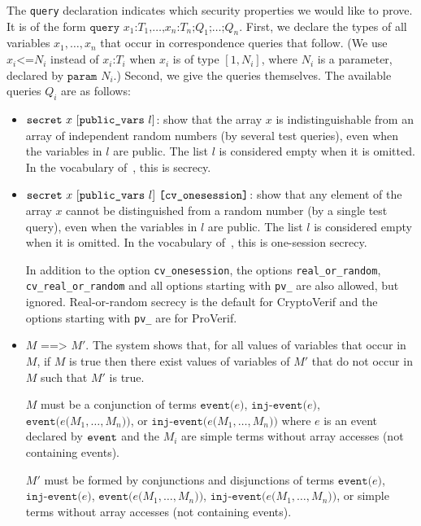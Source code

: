 \begin{itemize}
The {\tt query} declaration indicates which security properties we 
would like to prove. It is of the form $\texttt{query }x_1\texttt{:}T_1\texttt{,} \ldots\texttt{,} x_n\texttt{:}T_n\texttt{;} Q_1\texttt{;} \dots\texttt{;}Q_n$. First, we declare the types of all variables $x_1, \ldots, x_n$
that occur in correspondence queries that follow. (We use $x_i \texttt{<=} N_i$ instead of
  $x_i\texttt{:} T_i$ when $x_i$ is of type $[1,N_i]$, where $N_i$ is
  a parameter, declared by $\texttt{param }N_i$.) Second, we give the queries themselves. The available queries $Q_i$ are as follows:
\begin{itemize}

\item ${\tt secret}\ x\ [\texttt{public\_vars}\ l]$: show that the array $x$ is indistinguishable
from an array of independent random numbers (by several test queries),
even when the variables in $l$ are public. The list $l$ is considered empty when it is omitted.
In the vocabulary of~\cite{BlanchetEPrint05}, this is secrecy.

\item ${\tt secret}\ x\ [\texttt{public\_vars}\ l]\ \texttt{[cv\_onesession]}$: 
show that any element of the array $x$ 
cannot be distinguished from a random number (by a single test query),
even when the variables in $l$ are public. The list $l$ is considered empty when it is omitted.
In the vocabulary of~\cite{BlanchetEPrint05}, this is one-session
secrecy.

In addition to the option \texttt{cv\_onesession}, the options \texttt{real\_or\_random},
\texttt{cv\_real\_or\_random} and all options starting with \texttt{pv\_} are also allowed,
but ignored. Real-or-random secrecy is the default for CryptoVerif and
the options starting with \texttt{pv\_} are for ProVerif.

\item $M \texttt{ ==> } M'$.
The system shows that, for all values of variables that occur in $M$,
if $M$ is true then there exist values of variables of $M'$ that do not
occur in $M$ such that $M'$ is true.

$M$ must be a conjunction of terms $\texttt{event(}e\texttt{)}$, $\texttt{inj-event(}e\texttt{)}$, 
$\texttt{event(}e\texttt{(}M_1, \ldots, M_n\texttt{))}$, or 
$\texttt{inj-event(}e\texttt{(}M_1, \ldots, M_n\texttt{))}$
where $e$ is an event declared by ${\tt event}$ and
the $M_i$ are simple terms without array accesses (not containing
events). 

$M'$ must be formed by conjunctions and disjunctions of terms 
$\texttt{event(}e\texttt{)}$, $\texttt{inj-event(}e\texttt{)}$, 
$\texttt{event(}e\texttt{(}M_1, \ldots, M_n\texttt{))}$, 
$\texttt{inj-event(}e\texttt{(}M_1, \ldots, M_n\texttt{))}$, or
simple terms without array accesses
(not containing events).


\end{itemize}
\end{itemize}
